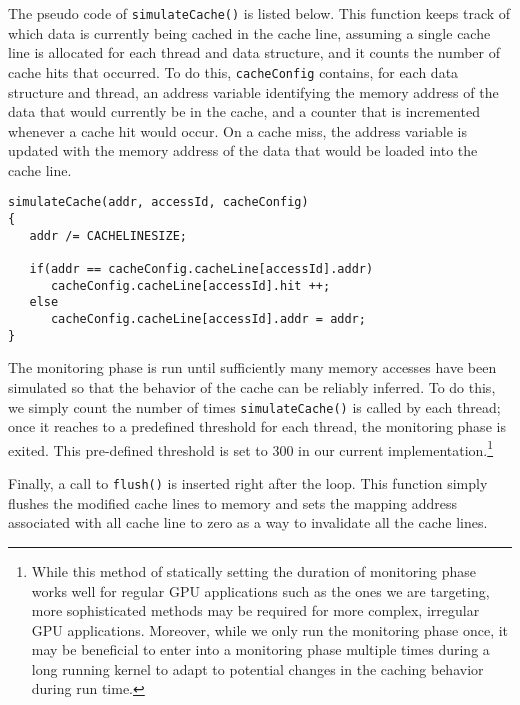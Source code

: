 The pseudo code of \texttt{simulateCache()} is listed below. 
This function keeps track of which data is currently being cached in the cache line,
assuming a single cache line is allocated for each thread and data structure,
and it counts the number of cache hits that occurred.
To do this, \texttt{cacheConfig} contains, for each data structure and thread, an address variable identifying the memory address of the data that would currently be in the cache,
and a counter that is incremented whenever a cache hit would occur.
On a cache miss, the address variable is updated with the memory address of the data that would be loaded into the cache line.


{\footnotesize
\begin{verbatim}
simulateCache(addr, accessId, cacheConfig)
{
   addr /= CACHELINESIZE;

   if(addr == cacheConfig.cacheLine[accessId].addr)
      cacheConfig.cacheLine[accessId].hit ++;
   else
      cacheConfig.cacheLine[accessId].addr = addr;
}
\end{verbatim}
}

The monitoring phase is run until sufficiently many memory accesses have been simulated so that the behavior of the cache can be reliably inferred. 
To do this, we simply count the number of times \texttt{simulateCache()} is called by each thread; once it reaches to a predefined threshold for each thread, the monitoring phase is exited.
This pre-defined threshold is set to 300 in our current implementation.\footnote{
	While this method of statically setting the duration of monitoring phase works 
	well for  regular GPU applications such as the ones we are targeting, 
	more sophisticated methods may be required for more complex,  
	irregular GPU applications. 
	Moreover, while we only run the monitoring phase once, it may be beneficial
	to enter into a monitoring phase multiple times during a long running kernel 
	to adapt to potential changes in the caching behavior during run time.}




Finally, a call to \texttt{flush()} is inserted right after the loop. 
This function simply flushes the modified cache lines to memory and sets the mapping address associated with all cache line to zero as a way to invalidate all the cache lines.



